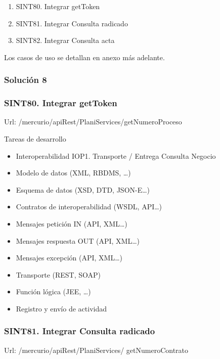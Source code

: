 \documentclass[
  paper=a4,
  ,captions=tableheading
]{scrartcl}
\providecommand{\tightlist}{%
  \setlength{\itemsep}{0pt}\setlength{\parskip}{0pt}}
\begin{document}
\begin{enumerate}
\def\labelenumi{\arabic{enumi}.}
\tightlist
\item
  SINT80. Integrar getToken
\item
  SINT81. Integrar Consulta radicado
\item
  SINT82. Integrar Consulta acta
\end{enumerate}

Los casos de uso se detallan en anexo más adelante.

\subsubsection{Solución 8}\label{sec:soluciuxf3n-8}

\subsubsection{SINT80. Integrar
getToken}\label{sec:sint80.-integrar-gettoken}

Url: /mercurio/apiRest/PlaniServices/getNumeroProceso

Tareas de desarrollo

\begin{itemize}
\tightlist
\item
  Interoperabilidad IOP1. Transporte / Entrega Consulta Negocio\\
\item
  Modelo de datos (XML, RBDMS, \ldots)
\item
  Esquema de datos (XSD, DTD, JSON-E\ldots)
\item
  Contratos de interoperabilidad (WSDL, API\ldots)
\item
  Mensajes petición IN (API, XML\ldots)
\item
  Mensajes respuesta OUT (API, XML\ldots)
\item
  Mensajes excepción (API, XML\ldots)
\item
  Transporte (REST, SOAP)
\item
  Función lógica (JEE, \ldots)
\item
  Registro y envío de actividad
\end{itemize}

\subsubsection{SINT81. Integrar Consulta
radicado}\label{sec:sint81.-integrar-consulta-radicado}

Url: /mercurio/apiRest/PlaniServices/ getNumeroContrato
\end{document}
